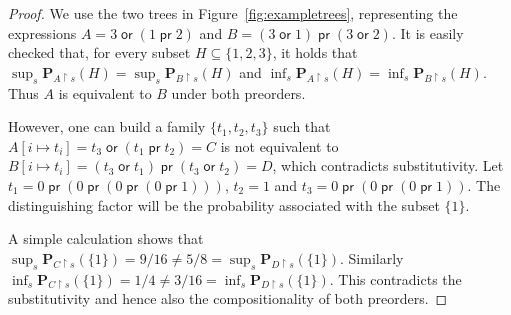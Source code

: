 \documentclass[a4paper,UKenglish]{lipics-v2018}
\newcommand{\prEff}{\operatorname{\textsf{pr}}}
\newcommand{\orEff}{\operatorname{\textsf{or}}}
\theoremstyle{plain}
\begin{document}
\begin{proof}
    We use the two trees in Figure~\ref{fig:exampletrees},
    representing the expressions $A = 3 \orEff (1 \prEff 2)$
    and $B = (3 \orEff 1) \prEff (3 \orEff 2)$. It is easily checked that, for every subset $H \subseteq \{ 1, 2, 3 \}$,
    it holds that $\sup_s  \mathbf{P}_{A\restriction s} (H) =  \sup_s \mathbf{P}_{B\restriction s} (H)$ and
    $\inf_s  \mathbf{P}_{A\restriction s} (H) =  \inf_s \mathbf{P}_{B\restriction s} (H)$.
     Thus $A$ is equivalent 
    to $B$ under  both preorders.

    However, one can build a family $\{ t_1, t_2, t_3\}$ such that 
    $A[ i \mapsto t_i] = t_3 \orEff (t_1 \prEff t_2) = C$ is not equivalent to 
    $B[ i\mapsto t_i] = (t_3 \orEff t_1) \prEff (t_3 \orEff t_2) = D$,
    which contradicts substitutivity.
    Let $t_1 = 0 \prEff (0 \prEff (0 \prEff (0 \prEff 1)))$,
    $t_2 = 1$ and $t_3 = 0 \prEff (0 \prEff (0 \prEff 1))$. The distinguishing 
    factor will be the probability associated with the subset $\{ 1 \}$.

    A simple calculation shows that $\sup_s  \mathbf{P}_{C\restriction s} (\{1\}) = 9/16
    \neq 5/8 = \sup_s \mathbf{P}_{D\restriction s} (\{ 1\})$. Similarly
    $\inf_s  \mathbf{P}_{C\restriction s} (\{1\}) = 1/4 \neq 3/16 =
     \inf_s \mathbf{P}_{D \restriction s } (\{1\})$.
     This contradicts the substitutivity and hence also the compositionality of both preorders.
\end{proof}
\end{document}
